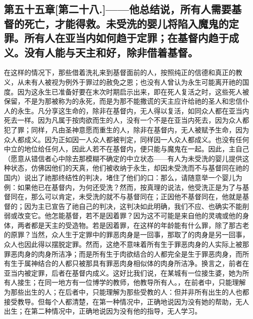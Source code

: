 
\subsection{第五十五章[第二十八.]——他总结说，所有人需要基督的死亡，才能得救。未受洗的婴儿将陷入魔鬼的定罪。所有人在亚当内如何趋于定罪；在基督内趋于成义。没有人能与天主和好，除非借着基督。}

在这样的情况下，那些借着洗礼来到基督面前的人，按照纯正的信德和真正的教义，从未有人被视为例外于罪过的赦免之恩；也没有人曾认为永生可能离开祂的国度。因为这永生已准备好要在末次时期启示出来，即在死人复活之时，这些死人被保留，不是为那被称为的永死，而是为那不能撒谎的天主应许给祂的圣人和忠信仆人的永生。凡分享这生命的，除非在基督内，无人得以复活，如同众人都在亚当内死去一样。因为凡属于按肉欲而生的人，没有一个不是在亚当内死去，因为众人都犯了罪；同样，凡由圣神意愿而重生的人，除非在基督内，无人被赋予生命，因为众人都成义。因为正如因一人众人都被判定，同样因一人众人都成义。也没有任何中立的地位给任何人，因此人若不在基督内，便只能与魔鬼在一起。因此，主自己（愿意从错信者心中除去那模糊不确定的中立状态——有人为未受洗的婴儿提供这种状态，仿佛因他们的天真，他们被收纳于永生，却因未受洗而不与基督同在祂的国内）说出了祂那终结性的判决，堵住了他们的口：那么，请随意举一个婴儿为例：如果他已在基督内，为何还受洗？然而，按真理的说法，他受洗正是为了与基督同在，那么可以肯定，未受洗的就不与基督同在；正因他不基督同在，他就是基督的；因为主已宣告了祂自己的判决，这判决如此明确，我们不应、也确实不能削弱或改变它。他怎能基督，若不是因着罪？因为这不可能是来自他的灵魂或他的身体，两者都是天主的受造物。若是因着罪，在这样的年龄能有什么罪，除了那古老的原罪？当然，众人生于定罪中的罪恶肉身是一回事，那取了的肉身是另一回事，众人也因此得以摆脱定罪。然而，这绝不意味着所有生于罪恶肉身的人实际上被那罪恶肉身的肉身所洁净；而是所有生于肉欲结合的人都完全是生于罪恶肉身，而所有生于属神结合的人都只被那具有罪恶肉身相似体的肉身所洁净。换言之，前者在亚当内被定罪，后者在基督内成义。这好比我们说，在某城有一位接生婆，她为所有人接生；在同一地方有一位博学的教师，他教导所有人。，在前者中，只能理解为那些出生的人；在后者中，只能理解为那些受教的人：但并非所有出生的人也都接受教导。但每个人都清楚，在第一种情况中，正确地说因为没有她的帮助，无人出生；在第二种情况中，正确地说因为没有他的指导，无人学习。\par

